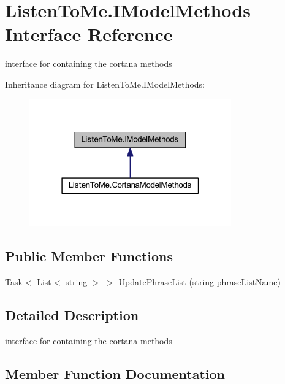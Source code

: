 \hypertarget{interface_listen_to_me_1_1_i_model_methods}{}\section{Listen\+To\+Me.\+I\+Model\+Methods Interface Reference}
\label{interface_listen_to_me_1_1_i_model_methods}


interface for containing the cortana methods  




Inheritance diagram for Listen\+To\+Me.\+I\+Model\+Methods\+:
\nopagebreak
\begin{figure}[H]
\begin{center}
\leavevmode
\includegraphics[width=247pt]{interface_listen_to_me_1_1_i_model_methods__inherit__graph}
\end{center}
\end{figure}
\subsection*{Public Member Functions}
\begin{DoxyCompactItemize}
\item 
Task$<$ List$<$ string $>$ $>$ \hyperlink{interface_listen_to_me_1_1_i_model_methods_a3df168676eb965dc8079af676c2cf47a}{Update\+Phrase\+List} (string phrase\+List\+Name)
\end{DoxyCompactItemize}


\subsection{Detailed Description}
interface for containing the cortana methods 



\subsection{Member Function Documentation}
